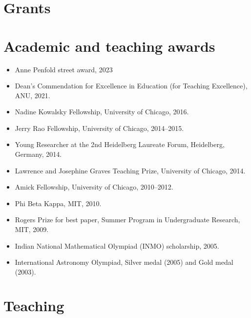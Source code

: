 \documentclass[a4paper]{moderncv}
\begin{document}
\section*{Grants}
\label{sec:org4eaf1af}

\section*{Academic and teaching awards}
\label{sec:orgdfb789e}
\begin{itemize}
\item Anne Penfold street award, 2023
\item Dean's Commendation for Excellence in Education (for Teaching Excellence), ANU, 2021.
\item Nadine Kowalsky Fellowship, University of Chicago, 2016.
\item Jerry Rao Fellowship, University of Chicago, 2014--2015.
\item Young Researcher at the 2nd Heidelberg Laureate Forum, Heidelberg, Germany, 2014.
\item Lawrence and Josephine Graves Teaching Prize, University of Chicago, 2014.
\item Amick Fellowship, University of Chicago, 2010--2012.
\item Phi Beta Kappa, MIT, 2010.
\item Rogers Prize for best paper, Summer Program in Undergraduate Research, MIT, 2009.
\item Indian National Mathematical Olympiad (INMO) scholarship, 2005.
\item International Astronomy Olympiad, Silver medal (2005) and Gold medal (2003).
\end{itemize}

\section*{Teaching}
\label{sec:orge9dbfc9}
\end{document}
